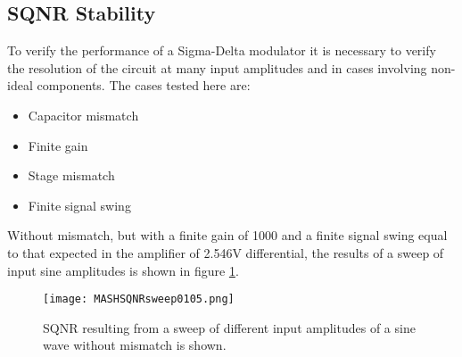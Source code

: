 %
%

    \subsection{SQNR Stability}
    To verify the performance of a Sigma-Delta modulator it is necessary to verify the resolution of the circuit at many input amplitudes and in cases involving non-ideal components.
    The cases tested here are:
    \begin{itemize}
        \item Capacitor mismatch
        \item Finite gain
        \item Stage mismatch
        \item Finite signal swing
    \end{itemize}

    Without mismatch, but with a finite gain of 1000 and a finite signal swing equal to that expected in the amplifier of 2.546V differential, the results of a sweep of input sine amplitudes is shown in figure \ref{fig:SQNRnominal}.

    \begin{figure}
        \begin{center}
        \texttt{[image: MASHSQNRsweep0105.png]}
        \caption{SQNR resulting from a sweep of different input amplitudes of a sine wave without mismatch is shown.}
        \label{fig:SQNRnominal}
        \end{center}
    \end{figure}  



